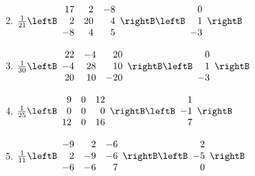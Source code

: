 \begin{multicols}{2}
\begin{ex}
\begin{enumerate}[label={\alph*.}]
\end{enumerate}
\begin{sol}
\begin{enumerate}[label={\alph*.}]
\setcounter{enumi}{1}
\item 
$\frac{1}{21}\leftB
\begin{array}{rrr}
	17 & 2 & -8\\
	2 & 20 & 4\\
	-8 & 4 & 5
\end{array}
\rightB
\leftB
\begin{array}{r}
0\\
1\\
-3
\end{array}
\rightB$

\setcounter{enumi}{3}
\item  
$\frac{1}{30}\leftB
\begin{array}{rrr}
22 & -4 & 20\\
-4 & 28 & 10\\
20 & 10 & -20
\end{array}
\rightB
\leftB
\begin{array}{r}
0\\
1\\
-3
\end{array}
\rightB$

\setcounter{enumi}{5}
\item  
$\frac{1}{25}\leftB
\begin{array}{rrr}
9 & 0 & 12\\
0 & 0 & 0\\
12 & 0 & 16
\end{array}
\rightB
\leftB
\begin{array}{r}
1\\
-1\\
7
\end{array}
\rightB$

\setcounter{enumi}{7}
\item 
 $\frac{1}{11}\leftB
\begin{array}{rrr}
-9 & 2 & -6\\
2 & -9 & -6\\
-6 & -6 & 7
\end{array}
\rightB
\leftB
\begin{array}{r}
2\\
-5\\
0
\end{array}
\rightB$

\end{enumerate}
\end{sol}
\end{ex}


\end{multicols}
